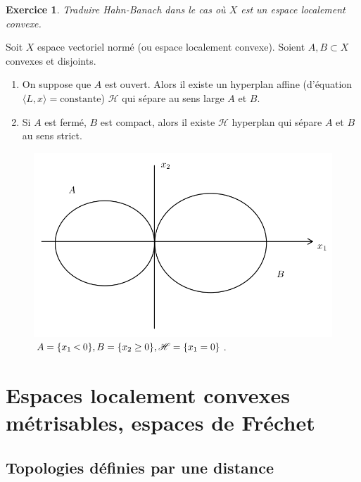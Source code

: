 \documentclass[french]{book}
\newtheorem{exo}{Exercice}
\newcommand{\lesss}{\rotatebox[origin=c]{90}{$\land$}}
\newcommand{\less}{\ \lesss\ }
\begin{document}
\begin{exo}
  Traduire Hahn-Banach dans le cas où $X$ est un espace localement convexe.
\end{exo}

\begin{thm}
  Soit $X$ espace vectoriel normé (ou espace localement convexe). Soient $A, B \subset X$ convexes et disjoints.

  \begin{enumerate}
    \item On suppose que $A$ est ouvert. Alors il existe un hyperplan affine (d'équation $\langle L,x \rangle = \text{constante}$) $\mathscr{H} $ qui sépare au sens large $A$ et $B$.
    \item Si $A$ est fermé, $B$ est compact, alors il existe $\mathscr{H} $ hyperplan qui sépare $A$ et $B$ au sens strict.
  \end{enumerate}
\end{thm}

\begin{figure}[h!]
  \centering
  \includegraphics[scale=0.3]{figures/hb-geo.png}
  \caption{$A = \{ x_1 \less 0 \}, B = \{ x_2 \geq 0 \}, \mathscr{H} = \{ x_1 = 0 \}  $.}
  \label{}
\end{figure}

\section{Espaces localement convexes métrisables, espaces de Fréchet} 

\subsection{Topologies définies par une distance}
\end{document}
